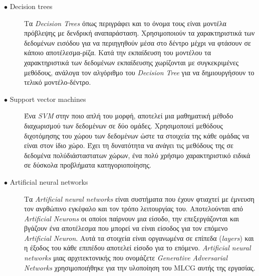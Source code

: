 \begin{description}

\item[$\bullet$ Decision trees] Τα \textit{Decision Trees} όπως περιγράφει και το όνομα τους είναι μοντέλα πρόβλεψης με δενδρική αναπαράσταση. Χρησιμοποιούν τα χαρακτηριστικά των δεδομένων εισόδου για να περιηγηθούν μέσα στο δέντρο μέχρι να φτάσουν σε κάποιο αποτέλεσμα-ρίζα. Κατά την εκπαίδευση του μοντέλου τα χαρακτηριστικά των δεδομένων εκπαίδευσης χωρίζονται με συγκεκριμένες μεθόδους, ανάλογα τον αλγόριθμο του \textit{Decision Tree} για να δημιουργήσουν το τελικό μοντέλο-δέντρο.

\item[$\bullet$ Support vector machines] Ένα \textit{SVM} στην ποιο απλή του μορφή, αποτελεί μια μαθηματική μέθοδο διαχωρισμού των δεδομένων σε δύο ομάδες. Χρησιμοποιεί μεθόδους διχοτόμησης του χώρου των δεδομένων ώστε τα στοιχεία της κάθε ομάδας να είναι στον ίδιο χώρο. Έχει τη δυνατότητα να ανάγει τις μεθόδους της σε δεδομένα πολύδιάσταστατων χώρων, ένα πολύ χρήσιμο χαρακτηριστικό ειδικά σε δύσκολα προβλήματα κατηγοριοποίησης. 

\item[$\bullet$ Artificial neural networks] Τα \textit{Artificial neural networks} είναι συστήματα που έχουν φτιαχτεί με έμνευση τον ανρθώπινο εγκέφαλο και τον τρόπο λειτουργίας του. Αποτελούνται από \textit{Artificial Neurons} οι οποίοι παίρνουν μια είσοδο, την επεξεργάζονται και βγάζουν ένα αποτέλεσμα που μπορεί να είναι είσοδος για τον επόμενο \textit{Artificial Neuron}. Αυτά τα στοιχεία είναι οργανωμένα σε επίπεδα (\textit{layers}) και η έξοδος του κάθε επιπέδου αποτελεί είσοδο για το επόμενο. \textit{Artificial neural networks} μιας αρχιτεκτονικής που ονομάζετε \textit{Generative Adversarial Networks} χρησιμοποιήθηκε για την υλοποίηση του MLCG αυτής της εργασίας.

\end{description}








